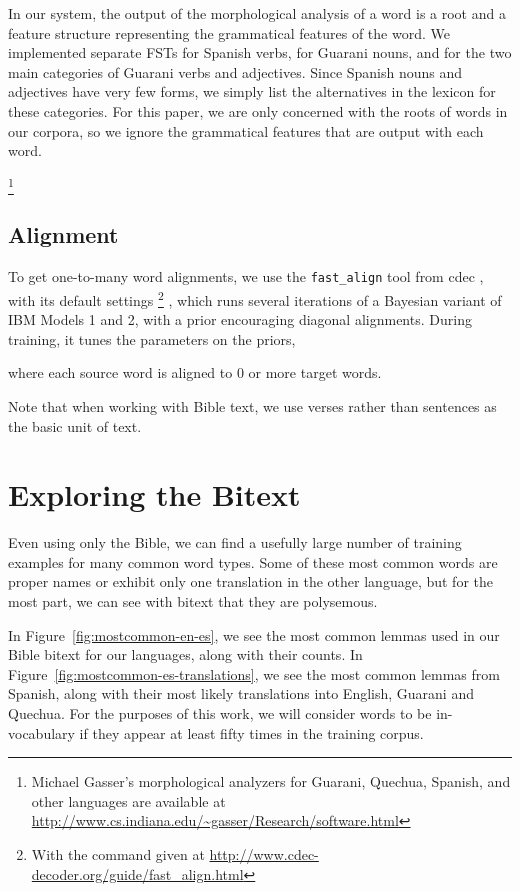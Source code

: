 In our system, the output of the morphological analysis of a word is a root and
a feature structure representing the grammatical features of the word.  We
implemented separate FSTs for Spanish verbs, for Guarani nouns, and for the two
main categories of Guarani verbs and adjectives.  Since Spanish nouns and
adjectives have very few forms, we simply list the alternatives in the lexicon
for these categories.  For this paper, we are only concerned with the roots of
words in our corpora, so we ignore the grammatical features that are output
with each word.

\footnote{Michael Gasser's morphological analyzers for Guarani, Quechua,
Spanish, and other languages are available at
\url{http://www.cs.indiana.edu/~gasser/Research/software.html}}



\subsection{Alignment}
To get one-to-many word alignments, we use the \texttt{fast\_align} tool from
cdec \cite{dyer-EtAl:2010:Demos}, with its default settings
\footnote{With the command given at
\url{http://www.cdec-decoder.org/guide/fast_align.html} }
, which runs several
iterations of a Bayesian variant of IBM Models 1 and 2, with a prior
encouraging diagonal alignments. During training, it tunes the parameters on
the priors, %

where each source word is aligned to 0 or more target words.

Note that when working with Bible text, we use verses rather than sentences as
the basic unit of text.



\section{Exploring the Bitext}
Even using only the Bible, we can find a usefully large number of training
examples for many common word types. Some of these most common words are proper
names or exhibit only one translation in the other language, but for the most
part, we can see with bitext that they are polysemous.

In Figure~\ref{fig:mostcommon-en-es}, we see the most common lemmas used in our
Bible bitext for our languages, along with their counts. In
Figure~\ref{fig:mostcommon-es-translations}, we see the most common lemmas from
Spanish, along with their most likely translations into English, Guarani and
Quechua. For the purposes of this work, we will consider words to be
in-vocabulary if they appear at least fifty times in the training corpus.

